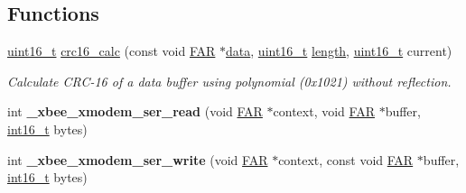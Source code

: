 \subsection*{Functions}
\begin{DoxyCompactItemize}
\item 
\hyperlink{group__hal_ga5a8b2dc9e45a9ee81a94ef304fb62505}{uint16\-\_\-t} \hyperlink{group__util__xmodem_ga48b65051c5461be6d016802e2eb8a138}{crc16\-\_\-calc} (const void \hyperlink{group__hal_gaef060b3456fdcc093a7210a762d5f2ed}{F\-A\-R} $\ast$\hyperlink{group__xbee__io_gac5955aa1e44ff234e6d78a19cf68f25c}{data}, \hyperlink{group__hal_ga5a8b2dc9e45a9ee81a94ef304fb62505}{uint16\-\_\-t} \hyperlink{group__zdo_gab2b3adeb2a67e656ff030b56727fd0ac}{length}, \hyperlink{group__hal_ga5a8b2dc9e45a9ee81a94ef304fb62505}{uint16\-\_\-t} current)
\begin{DoxyCompactList}\small\item\em Calculate C\-R\-C-\/16 of a data buffer using polynomial (0x1021) without reflection. \end{DoxyCompactList}\item 
\hypertarget{group__util__xmodem_gae12995a59299dd50542d7a9eb6ddfd2c}{int {\bfseries \-\_\-xbee\-\_\-xmodem\-\_\-ser\-\_\-read} (void \hyperlink{group__hal_gaef060b3456fdcc093a7210a762d5f2ed}{F\-A\-R} $\ast$context, void \hyperlink{group__hal_gaef060b3456fdcc093a7210a762d5f2ed}{F\-A\-R} $\ast$buffer, \hyperlink{group__hal_ga2140805d08462d474b82ddc8d1c2f3e6}{int16\-\_\-t} bytes)}\label{group__util__xmodem_gae12995a59299dd50542d7a9eb6ddfd2c}

\item 
\hypertarget{group__util__xmodem_ga913fe444bce75fa12169083fbbf9ef03}{int {\bfseries \-\_\-xbee\-\_\-xmodem\-\_\-ser\-\_\-write} (void \hyperlink{group__hal_gaef060b3456fdcc093a7210a762d5f2ed}{F\-A\-R} $\ast$context, const void \hyperlink{group__hal_gaef060b3456fdcc093a7210a762d5f2ed}{F\-A\-R} $\ast$buffer, \hyperlink{group__hal_ga2140805d08462d474b82ddc8d1c2f3e6}{int16\-\_\-t} bytes)}\label{group__util__xmodem_ga913fe444bce75fa12169083fbbf9ef03}


\end{DoxyCompactItemize}
